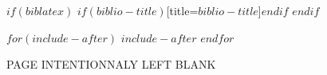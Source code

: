 \documentclass[$if(fontsize)$$fontsize$,$endif$$if(lang)$$babel-lang$,$endif$$if(papersize)$$papersize$paper,$endif$$for(classoption)$$classoption$$sep$,$endfor$]{$documentclass$}
\begin{document}
$if(biblatex)$
    \printbibliography$if(biblio-title)$[title=$biblio-title$]$endif$
    \newpage
$endif$

$for(include-after)$
    $include-after$
    \newpage
$endfor$

\newpage
\thispagestyle{empty}
\clearpage
\vspace*{\fill}
\begin{center}
\begin{minipage}{.6\textwidth}
\centering PAGE INTENTIONNALY LEFT BLANK
\end{minipage}
\end{center}
\vfill %
\clearpage
\end{document}
